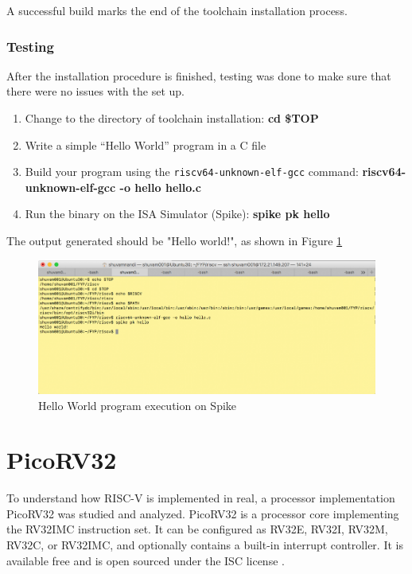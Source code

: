 A successful build marks the end of the toolchain installation process.

\subsubsection{Testing}
\label{sect6_2_2_2}
After the installation procedure is finished, testing was done to make sure that there were no issues with the set up. 
\begin{enumerate}
\item Change to the directory of toolchain installation:\newline
\small \textbf{cd \$TOP}
\item Write a simple “Hello World” program in a C file
\item Build your program using the \verb|riscv64-unknown-elf-gcc| command:\newline
\small \textbf{riscv64-unknown-elf-gcc -o hello hello.c}
\item Run the binary on the ISA Simulator (Spike):\newline
\small \textbf{spike pk hello}
\end{enumerate}
The output generated should be "Hello world!", as shown in Figure \ref{fig:riscv3}

\begin{figure}[h!]
\centering
\includegraphics[width=14cm]{figures/Spike_Output.png}
\caption{Hello World program execution on Spike}
\label{fig:riscv3}
\end{figure}

 \section{PicoRV32}
  \label{sect6_3}
To understand how RISC-V is implemented in real, a processor implementation PicoRV32 was studied and analyzed. PicoRV32 is a processor core implementing the RV32IMC instruction set. It can be configured as RV32E, RV32I, RV32M, RV32C, or RV32IMC, and optionally contains a built-in interrupt controller. It is available free and is open sourced under the ISC license \cite{picorv32}. 

